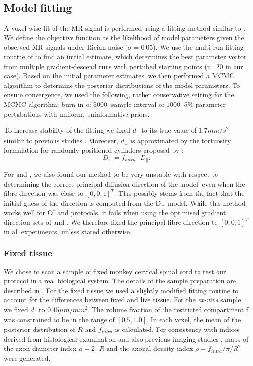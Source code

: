 \subsection{Model fitting}
A voxel-wise fit of the MR signal is performed using a fitting method similar to \citet{Alexander:2010}. We define the objective function as the likelihood of model parameters given the observed MR signals under Rician noise ($\sigma=0.05$). We use the multi-run fitting routine of \citet{Panagiotaki:2012} to find an initial estimate, which determines the best parameter vector from multiple gradient-descend runs with pertubed starting points (n=20 in our case). Based on the initial parameter estimates, we then performed a \gls{MCMC} algorithm to determine the posterior distributions of the model parameters. To ensure convergence, we used the following, rather conservative setting for the \gls{MCMC} algorithm: burn-in of 5000, sample interval of 1000, 5\% parameter pertubations with uniform, uninformative priors.

To increase stability of the fitting we fixed $d_\parallel$ to its true value of $1.7mm/s^2$ similar to previous studies \citep{Assaf:2008,Barazany:2009,Alexander:2010}. Moreover, $d_\bot$ is approximated by the tortuosity formulation for randomly positioned cylinders proposed by \citet{Szafer:1995}:
\begin{equation}
    D_{\bot} = f_{intra}\cdot D_{\parallel}.
\end{equation}


For {\DO} and {\FD}, we also found our method to be very unstable with respect to determining the correct principal diffusion direction of the model, even when the fibre direction was close to $[0,0,1]^T$. This possibly stems from the fact that the initial guess of the direction is computed from the \gls{DT} model. While this method works well for {\gls{OI}} and {\SD} protocols, it fails when using the optimised gradient direction sets of {\DO} and {\FD}. We therefore fixed the principal fibre direction to $[0,0,1]^T$ in all experiments, unless stated otherwise.

\subsubsection{Fixed tissue}
We chose to scan a sample of fixed monkey cervical spinal cord to test our protocol in a real biological system. The details of the sample preparation are described in \citep{Lundell:2011}. For the fixed tissue we used a slightly modified fitting routine to account for the differences between fixed and live tissue. For the \emph{ex-vivo} sample we fixed $d_{\|}$ to $0.45\mu m/mm^2$. The volume fraction of the restricted compartment f was constrained to be in the range of $[0.5, 1.0]$. In each voxel, the mean of the posterior distribution of $R$ and $f_{intra}$ is calculated. For consistency with indices derived from histological examination \citep{Keyserlingk:1984,LaMantia:1990a,Aboitiz:1992} and also previous imaging studies \citep{Alexander:2010}, maps of the axon diameter index $a=2\cdot R$ and the axonal density index $\rho=f_{intra}/\pi/R^2$ were generated.

